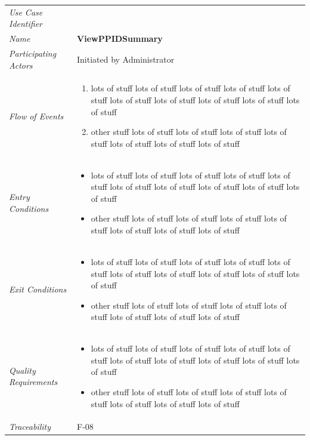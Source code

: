 \documentclass[12pt,letterpaper]{article}
\begin{document}
\begin{center}
	\begin{tabu} to 
		\toprule
		Use Case Identifier & \viewppidsummary{} \\
		Name & {\bf ViewPPIDSummary} \\
		Participating Actors & Initiated by Administrator \\
		Flow of Events & 
	    \begin{enumerate}[topsep=-1em]
		    \item lots of stuff lots of stuff lots of stuff lots of stuff lots of stuff lots of stuff lots of stuff lots of stuff lots of stuff lots of stuff
		    \item other stuff lots of stuff lots of stuff lots of stuff lots of stuff lots of stuff lots of stuff lots of stuff
		\end{enumerate} \\

		Entry Conditions &
		\begin{itemize}[topsep=-1em]
		    \item lots of stuff lots of stuff lots of stuff lots of stuff lots of stuff lots of stuff lots of stuff lots of stuff lots of stuff lots of stuff
		    \item other stuff lots of stuff lots of stuff lots of stuff lots of stuff lots of stuff lots of stuff lots of stuff
        \end{itemize} \\

		Exit Conditions &
		\begin{itemize}[topsep=-1em]
		    \item lots of stuff lots of stuff lots of stuff lots of stuff lots of stuff lots of stuff lots of stuff lots of stuff lots of stuff lots of stuff
		    \item other stuff lots of stuff lots of stuff lots of stuff lots of stuff lots of stuff lots of stuff lots of stuff
        \end{itemize} \\

		Quality Requirements &
		\begin{itemize}[topsep=-1em]
		    \item lots of stuff lots of stuff lots of stuff lots of stuff lots of stuff lots of stuff lots of stuff lots of stuff lots of stuff lots of stuff
		    \item other stuff lots of stuff lots of stuff lots of stuff lots of stuff lots of stuff lots of stuff lots of stuff
        \end{itemize} \\

		Traceability & F-08 \\
		\toprule
	\end{tabu}
\end{center}
\end{document}
